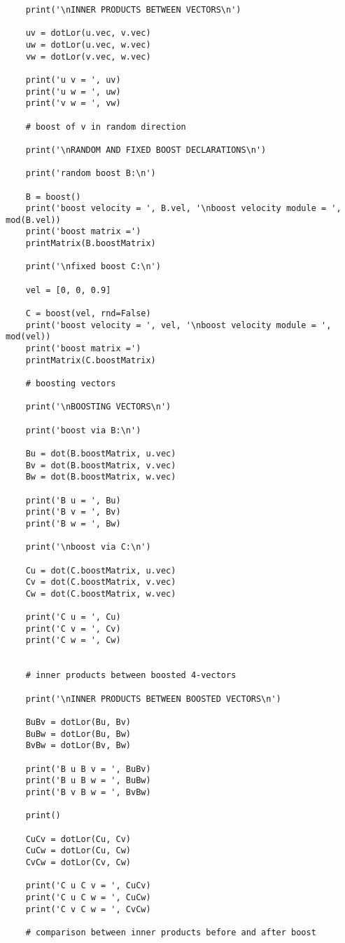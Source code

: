\documentclass[12pt,notitlepage]{report}
\begin{document}
\begin{verbatim}
	print('\nINNER PRODUCTS BETWEEN VECTORS\n')
	
	uv = dotLor(u.vec, v.vec)
	uw = dotLor(u.vec, w.vec)
	vw = dotLor(v.vec, w.vec)
	
	print('u v = ', uv)
	print('u w = ', uw)
	print('v w = ', vw)
	
	# boost of v in random direction
	
	print('\nRANDOM AND FIXED BOOST DECLARATIONS\n')
	
	print('random boost B:\n')
	
	B = boost()
	print('boost velocity = ', B.vel, '\nboost velocity module = ', mod(B.vel))
	print('boost matrix =')
	printMatrix(B.boostMatrix)
	
	print('\nfixed boost C:\n')
	
	vel = [0, 0, 0.9]
	
	C = boost(vel, rnd=False)
	print('boost velocity = ', vel, '\nboost velocity module = ', mod(vel))
	print('boost matrix =')
	printMatrix(C.boostMatrix)
	
	# boosting vectors
	
	print('\nBOOSTING VECTORS\n')
	
	print('boost via B:\n')
	
	Bu = dot(B.boostMatrix, u.vec)
	Bv = dot(B.boostMatrix, v.vec)
	Bw = dot(B.boostMatrix, w.vec)
	
	print('B u = ', Bu)
	print('B v = ', Bv)
	print('B w = ', Bw)
	
	print('\nboost via C:\n')
	
	Cu = dot(C.boostMatrix, u.vec)
	Cv = dot(C.boostMatrix, v.vec)
	Cw = dot(C.boostMatrix, w.vec)
	
	print('C u = ', Cu)
	print('C v = ', Cv)
	print('C w = ', Cw)
	
	
	# inner products between boosted 4-vectors
	
	print('\nINNER PRODUCTS BETWEEN BOOSTED VECTORS\n')
	
	BuBv = dotLor(Bu, Bv)
	BuBw = dotLor(Bu, Bw)
	BvBw = dotLor(Bv, Bw)
	
	print('B u B v = ', BuBv)
	print('B u B w = ', BuBw)
	print('B v B w = ', BvBw)
	
	print()
	
	CuCv = dotLor(Cu, Cv)
	CuCw = dotLor(Cu, Cw)
	CvCw = dotLor(Cv, Cw)
	
	print('C u C v = ', CuCv)
	print('C u C w = ', CuCw)
	print('C v C w = ', CvCw)
	
	# comparison between inner products before and after boost
	

\end{verbatim}
\end{document}
